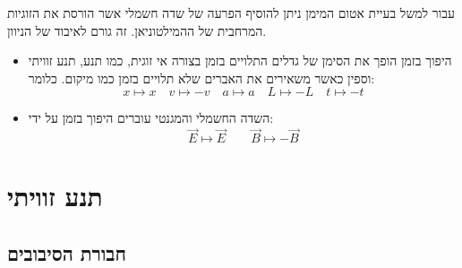\documentclass{tstextbook}
\begin{document}
\begin{example}
עבור למשל בעיית אטום המימן ניתן להוסיף הפרעה של שדה חשמלי אשר הורסת את הזוגיות המרחבית של ההמילטוניאן. זה גורם לאיבוד של הניוון.

\end{example}
\begin{summary}
  \begin{itemize}
    \item היפוך בזמן הופך את הסימן של גדלים התלויים בזמן בצורה אי זוגית, כמו תנע, תנע זוויתי וספין כאשר משאירים את האברים שלא תלויים בזמן כמו מיקום. כלומר:
$$x\mapsto x\quad v\mapsto -v\quad a\mapsto a\quad L\mapsto -L\quad t\mapsto-t$$
    \item השדה החשמלי והמגנטי עוברים היפוך בזמן על ידי:
$$\vec{E}\mapsto \vec{E}\qquad \vec{B}\mapsto-\vec{B}$$
  \end{itemize}
\end{summary}
\chapter{תנע זוויתי}

\section{חבורת הסיבובים}
\end{document}
